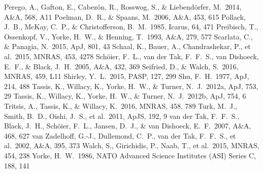 \documentclass{mn2e}
\newcommand{\apj}{ApJ}
\newcommand{\mnras}{MNRAS}
\newcommand{\apjs}{ApJS}
\newcommand{\pasp}{PASP}
\newcommand{\aap}{A\&A}
\newcommand{\icarus}{Icarus}
\begin{document}
\begin{thebibliography}{99}
 Perego, A., Gafton, E., Cabez{\'o}n, R., Rosswog, S., \& Liebend{\"o}rfer, M.\ 2014, \aap, 568, A11 
 Poelman, D.~R., \& Spaans, M.\ 2006, \aap, 453, 615  
 Pollack, J.~B., McKay, C.~P., \& Christofferson, B.~M.\ 1985, \icarus, 64, 471
 Preibisch, T., Ossenkopf, V., Yorke, H.~W., \& Henning, T.\ 1993, \aap, 279, 577 
 Scarlata, C., \& Panagia, N.\ 2015, \apj, 801, 43 
 Schaal, K., Bauer, A., Chandrashekar, P., et al.\ 2015, \mnras, 453, 4278 
 Sch{\"o}ier, F.~L., van der Tak, F.~F.~S., van Dishoeck, E.~F., \& Black, J.~H.\ 2005, \aap, 432, 369 
 Seifried, D., \& Walch, S.\ 2016, \mnras, 459, L11
 Shirley, Y.~L.\ 2015, \pasp, 127, 299 
 Shu, F.~H.\ 1977, \apj, 214, 488 
 Tassis, K., Willacy, K., Yorke, H.~W., \& Turner, N.~J.\ 2012a, \apj, 753, 29
 Tassis, K., Willacy, K., Yorke, H.~W., \& Turner, N.~J.\ 2012b, \apj, 754, 6
 Tritsis, A., Tassis, K., \& Willacy, K.\ 2016, \mnras, 458, 789 
 Turk, M.~J., Smith, B.~D., 
Oishi, J.~S., et al.\ 2011, \apjs, 192, 9 
 van der Tak, F.~F.~S., Black, J.~H., Sch{\"o}ier, F.~L., Jansen, D.~J., \& van Dishoeck, E.~F.\ 2007, \aap, 468, 627 
 van Zadelhoff, G.-J., Dullemond, C.~P., van der Tak, F.~F.~S., et al.\ 2002, \aap, 395, 373 
 Walch, S., Girichidis, P., Naab, T., et al.\ 2015, \mnras, 454, 238
 Yorke, H.~W.\ 1986, NATO Advanced Science Institutes (ASI) Series C, 188, 141 


\end{thebibliography}
\end{document}
